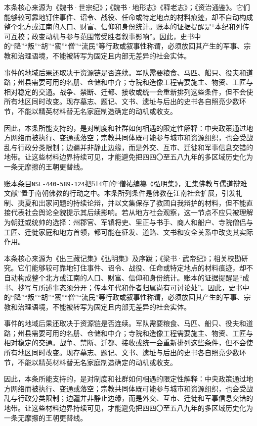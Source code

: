 本条核心来源为《魏书·世宗纪》；《魏书·地形志》《释老志》；《资治通鉴》。它们能够较可靠地钉住事件、诏令、战役、任命或特定地点的材料痕迹，却不自动构成整个北方或江南的人口、财富、信仰和身份统计。账本的证据提醒是“本纪和列传可互校；政变动机与参与范围常受胜者叙事影响”。因此，史书中的“降”“叛”“胡”“蛮”“僧”“流民”等行政或叙事性称谓，必须放回其产生的军事、宗教和治理语境，不能被转写为固定且内部无差异的社会实体。

事件的地域后果还取决于资源链是否连续。军队需要粮食、马匹、船只、役夫和道路；州县需要可用的名册、仓储和中介；寺院和造像工程需要施主、物资、工匠与相对稳定的交通。战争、禁断、迁都、接收或统一会重新排列这些条件，但不会使所有地区同时改变。现存墓志、题记、文书、遗址与后出的史书各自照亮少数环节，不能以精英材料替无名家庭制造确定的动机或收支。

因此，本条所能支持的，是对制度和社群如何相遇的限定性解释：中央政策通过地方网络而被执行、变通或落空；宗教共同体既可能参与城市和资源组织，也会受战乱与行政分类限制；边疆并非静止边缘，而是外交、互市、迁徙和军事信息交错的地带。让这些材料边界持续可见，才能避免把四四〇至五八九年的多区域历史化为一条无摩擦的王朝更替线。

账本条目\texttt{NSL-440-589-124}把514年的“僧祐编纂《弘明集》，汇集佛教与儒道辩难文献”置于南朝佛教的行动之中。本条所列条件是佛教在江南社会扩展，引发礼制、夷夏和出家问题的持续论辩，并以文集保存了教团自我辩护的材料，但不能直接代表社会舆论全貌提示其后续影响。若从地方社会观察，这一节点不应只被理解为朝廷或统帅的选择：州郡官、军镇将吏、里正与书手、商人和船户、寺院僧侣与工匠、迁徙家庭和地方首领，都可能在征发、道路、文书和安全关系中改变其实际作用。

本条核心来源为《出三藏记集》《弘明集》及序跋；《梁书·武帝纪》；相关校勘研究。它们能够较可靠地钉住事件、诏令、战役、任命或特定地点的材料痕迹，却不自动构成整个北方或江南的人口、财富、信仰和身份统计。账本的证据提醒是“成书、抄写与所述事态须分开；传本年代和作者归属尚有可讨论处”。因此，史书中的“降”“叛”“胡”“蛮”“僧”“流民”等行政或叙事性称谓，必须放回其产生的军事、宗教和治理语境，不能被转写为固定且内部无差异的社会实体。

事件的地域后果还取决于资源链是否连续。军队需要粮食、马匹、船只、役夫和道路；州县需要可用的名册、仓储和中介；寺院和造像工程需要施主、物资、工匠与相对稳定的交通。战争、禁断、迁都、接收或统一会重新排列这些条件，但不会使所有地区同时改变。现存墓志、题记、文书、遗址与后出的史书各自照亮少数环节，不能以精英材料替无名家庭制造确定的动机或收支。

因此，本条所能支持的，是对制度和社群如何相遇的限定性解释：中央政策通过地方网络而被执行、变通或落空；宗教共同体既可能参与城市和资源组织，也会受战乱与行政分类限制；边疆并非静止边缘，而是外交、互市、迁徙和军事信息交错的地带。让这些材料边界持续可见，才能避免把四四〇至五八九年的多区域历史化为一条无摩擦的王朝更替线。


